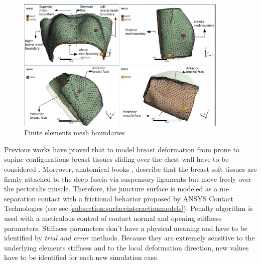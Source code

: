 \begin{figure}[!h]
\centering
\includegraphics[width=0.9\textwidth,keepaspectratio]{figures/mesh_parts_2.png} 
\caption{Finite elements mesh boundaries}\label{fig:meshboundaries}
\end{figure}

Previous works have proved that to model breast deformation from prone to supine configurations breast tissues sliding over the chest wall have to be considered \citep{carter_application_2012,han_nonlinear_2014}. Moreover, anatomical books \citep{mugea2014aesthetic,clemente2011anatomy},  describe that the breast soft tissues are firmly attached to the deep fascia via suspensory ligaments but move freely over the pectoralis muscle.  Therefore, the juncture surface is modeled as a no-separation contact with a frictional behavior proposed by ANSYS Contact Technologies (see sec.\ref{subsection:surfaceinteractionmodels}). Penalty algorithm  is used with a meticulous control of contact normal and opening stiffness parameters. Stiffness parameters don't have a physical meaning and have to be identified by \textit{trial and error} methods. Because they are extremely sensitive to the underlying elements stiffness and to the local deformation direction, new values have to be identified for each new simulation case.    

